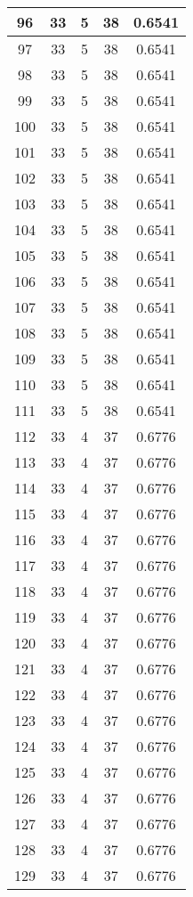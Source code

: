 \documentclass[letterpaper, 12pt]{article}
\begin{document}
\begin{longtable}{|c|c|c|c|c|}
\hline
96 & 33 & 5 & 38 & 0.6541 \\
\hline
97 & 33 & 5 & 38 & 0.6541 \\
\hline
98 & 33 & 5 & 38 & 0.6541 \\
\hline
99 & 33 & 5 & 38 & 0.6541 \\
\hline
100 & 33 & 5 & 38 & 0.6541 \\
\hline
101 & 33 & 5 & 38 & 0.6541 \\
\hline
102 & 33 & 5 & 38 & 0.6541 \\
\hline
103 & 33 & 5 & 38 & 0.6541 \\
\hline
104 & 33 & 5 & 38 & 0.6541 \\
\hline
105 & 33 & 5 & 38 & 0.6541 \\
\hline
106 & 33 & 5 & 38 & 0.6541 \\
\hline
107 & 33 & 5 & 38 & 0.6541 \\
\hline
108 & 33 & 5 & 38 & 0.6541 \\
\hline
109 & 33 & 5 & 38 & 0.6541 \\
\hline
110 & 33 & 5 & 38 & 0.6541 \\
\hline
111 & 33 & 5 & 38 & 0.6541 \\
\hline
112 & 33 & 4 & 37 & 0.6776 \\
\hline
113 & 33 & 4 & 37 & 0.6776 \\
\hline
114 & 33 & 4 & 37 & 0.6776 \\
\hline
115 & 33 & 4 & 37 & 0.6776 \\
\hline
116 & 33 & 4 & 37 & 0.6776 \\
\hline
117 & 33 & 4 & 37 & 0.6776 \\
\hline
118 & 33 & 4 & 37 & 0.6776 \\
\hline
119 & 33 & 4 & 37 & 0.6776 \\
\hline
120 & 33 & 4 & 37 & 0.6776 \\
\hline
121 & 33 & 4 & 37 & 0.6776 \\
\hline
122 & 33 & 4 & 37 & 0.6776 \\
\hline
123 & 33 & 4 & 37 & 0.6776 \\
\hline
124 & 33 & 4 & 37 & 0.6776 \\
\hline
125 & 33 & 4 & 37 & 0.6776 \\
\hline
126 & 33 & 4 & 37 & 0.6776 \\
\hline
127 & 33 & 4 & 37 & 0.6776 \\
\hline
128 & 33 & 4 & 37 & 0.6776 \\
\hline
129 & 33 & 4 & 37 & 0.6776 \\

\end{longtable}
\end{document}
